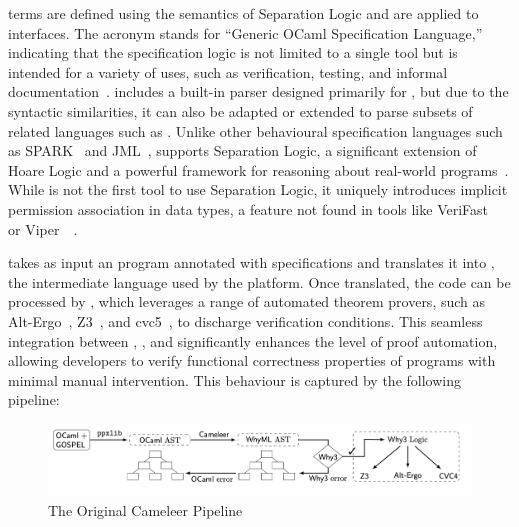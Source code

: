 \gospel terms are defined using the semantics of Separation Logic and are applied to \ocaml interfaces. The acronym \gospel stands 
for “Generic OCaml Specification Language,” indicating that the specification logic is not limited to a single tool but is intended 
for a variety of uses, such as verification, testing, and informal documentation~\cite{ChargueraudFLP19}. \gospel includes a built-in 
parser designed primarily for \ocaml, but due to the syntactic similarities, it can also be adapted or extended to parse subsets of 
related languages such as \cml. Unlike other behavioural specification languages such as \textsf{SPARK}~\cite{SPARK} and 
\textsf{JML}~\cite{article}, \gospel 
supports Separation Logic, a significant extension of Hoare Logic and a powerful framework for reasoning about real-world 
programs~\cite{Reynolds02, OHearnRY01}. While \gospel is not the first tool to use Separation Logic, it uniquely introduces implicit 
permission association in data types, a feature not found in tools like \textsf{VeriFast}~\cite{JacobsSPVPP11} or 
\textsf{Viper}~\cite{0001SS16}~\cite{ChargueraudFLP19}.

\cameleer takes as input an \ocaml program annotated with \gospel specifications and translates it into \whyml, the intermediate 
language used by the \whythree platform. Once translated, the code can be processed by \whythree, which leverages a range of automated 
theorem provers, such as Alt-Ergo~\cite{ConchonIM17}, Z3~\cite{MouraB08}, and cvc5~\cite{BarbosaBBKLMMMN22}, to discharge verification 
conditions. This seamless integration between \cameleer, 
\gospel, and \whythree significantly enhances the level of proof automation, allowing developers to verify functional correctness 
properties of \ocaml programs with minimal manual intervention. This behaviour is captured by the following pipeline:

\begin{figure}[H]
    \centering
    \includegraphics[width=\linewidth]{images/Cameleer_From_Paper.png}
    \caption{The Original Cameleer Pipeline~\cite{PereiraR20}}
    \label{fig:CameleerPipeline}
\end{figure}

